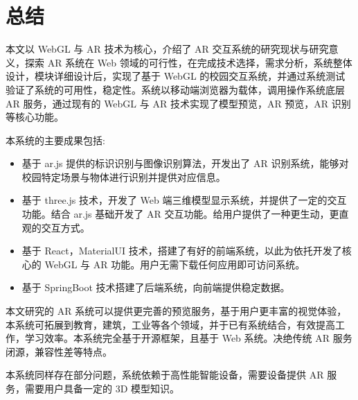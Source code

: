 \section{总结}

本文以 WebGL 与 AR 技术为核心，介绍了 AR 交互系统的研究现状与研究意义，探索 AR 系统在 Web 领域的可行性，在完成技术选择，需求分析，系统整体设计，模块详细设计后，实现了基于 WebGL 的校园交互系统，并通过系统测试验证了系统的可用性，稳定性。系统以移动端浏览器为载体，调用操作系统底层 AR 服务，通过现有的 WebGL 与 AR 技术实现了模型预览，AR 预览，AR 识别等核心功能。

本系统的主要成果包括:
\begin{itemize}
  \item 基于 ar.js 提供的标识识别与图像识别算法，开发出了 AR 识别系统，能够对校园特定场景与物体进行识别并提供对应信息。
  \item 基于 three.js 技术，开发了 Web 端三维模型显示系统，并提供了一定的交互功能。结合 ar.js 基础开发了 AR 交互功能。给用户提供了一种更生动，更直观的交互方式。
  \item 基于 React，MaterialUI 技术，搭建了有好的前端系统，以此为依托开发了核心的 WebGL 与 AR 功能。用户无需下载任何应用即可访问系统。
  \item 基于 SpringBoot 技术搭建了后端系统，向前端提供稳定数据。
\end{itemize}

本文研究的 AR 系统可以提供更完善的预览服务，基于用户更丰富的视觉体验，本系统可拓展到教育，建筑，工业等各个领域，并于已有系统结合，有效提高工作，学习效率。本系统完全基于开源框架，且基于 Web 系统。决绝传统 AR 服务闭源，兼容性差等特点。

本系统同样存在部分问题，系统依赖于高性能智能设备，需要设备提供 AR 服务，需要用户具备一定的 3D 模型知识。